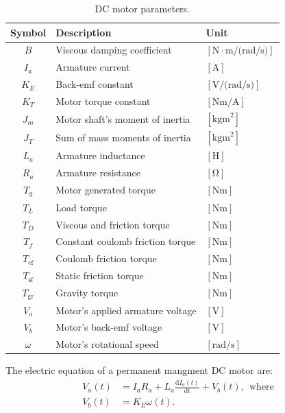 %
\begin{table}
  \centering
  \caption{DC motor parameters.}
  \label{tab:DC-MotorParameters}  
  \begin{tabular}{c|l|l}
    \toprule
    Symbol & Description & Unit\\
    \toprule
    $B$&Viscous damping coefficient&$[\si{\newton\cdot\meter\per(\radian\per\second)}]$\\
    $I_a$&Armature current &$[\si{\ampere}]$\\
    $K_E$&Back-emf constant &$[\si{\volt\per(\radian\per\second)}]$\\
    $K_T$&Motor torque constant &$[\si{\newton\meter\per\ampere}]$\\        
    $J_m$&Motor shaft's moment of inertia&$[\si{\kilogram\meter}^2]$\\
    $J_T$& Sum of mass moments of inertia&$[\si{\kilogram\meter}^2]$\\    
    $L_a$&Armature inductance &$[\si{\henry}]$\\
    $R_a$&Armature resistance &$[\si{\ohm}]$\\   
    $T_g$&Motor generated torque &$[\si{\newton\meter}]$\\
    $T_L$&Load torque &$[\si{\newton\meter}]$\\        
    $T_D$&Viscous and friction torque &$[\si{\newton\meter}]$\\    
    $T_f$&Constant coulomb friction torque &$[\si{\newton\meter}]$\\    
    $T_{\mathrm{cf}}$&Coulomb friction torque &$[\si{\newton\meter}]$\\
    $T_{\mathrm{sf}}$&Static friction torque &$[\si{\newton\meter}]$\\
    $T_{\mathrm{gr}}$&Gravity torque &$[\si{\newton\meter}]$\\                
    $V_a$&Motor's applied armature voltage &$[\si{\volt}]$\\
    $V_b$&Motor's back-emf voltage &$[\si{\volt}]$\\
    $\omega$&Motor's rotational speed &$[\si{\radian\per\second}]$\\
    \bottomrule
  \end{tabular}
\end{table}
%
The electric equation of a permanent mangment DC motor are: %
%
\begin{subequations}
  \label{eq:electricModel}
  \begin{align}
    \label{eq:motorElectrical}
    V_a(t) & = I_aR_a + L_a\frac{\mathrm{d}I_a(t)}{\mathrm{dt}} + V_b(t),~~\mathrm{where}\\
    \label{eq:Vb}
    V_b(t) & = K_E\omega(t).
\end{align}  
\end{subequations}
